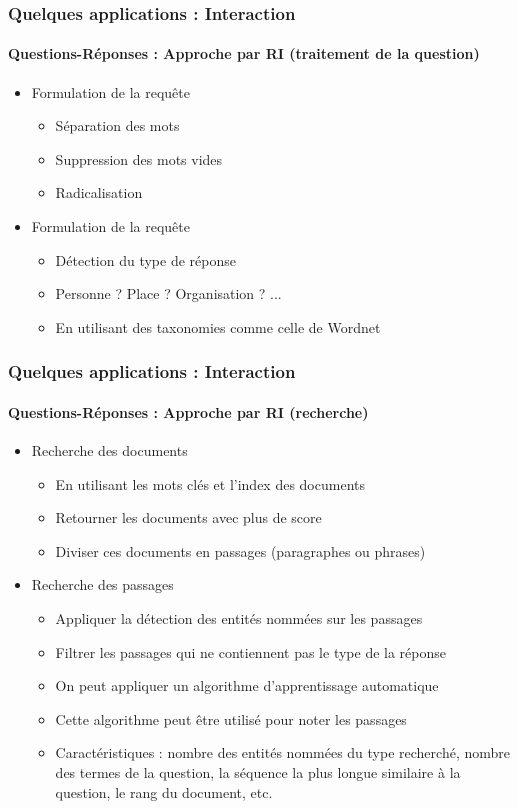 \documentclass[xcolor=table]{beamer}
\begin{document}
\begin{frame}
	\frametitle{Quelques applications : Interaction}
	\framesubtitle{Questions-Réponses : Approche par RI (traitement de la question)}
	
	\begin{itemize}
		\item Formulation de la requête
		\begin{itemize}
			\item Séparation des mots
			\item Suppression des mots vides
			\item Radicalisation  
		\end{itemize}
	    \item Formulation de la requête
	    \begin{itemize}
	    	\item Détection du type de réponse
	    	\item Personne ? Place ? Organisation ? ...
	    	\item En utilisant des taxonomies comme celle de Wordnet  
	    \end{itemize}
	\end{itemize}
	
\end{frame}

\begin{frame}
	\frametitle{Quelques applications : Interaction}
	\framesubtitle{Questions-Réponses : Approche par RI (recherche)}
	
	\begin{itemize}
		\item Recherche des documents
		\begin{itemize}
			\item En utilisant les mots clés et l'index des documents
			\item Retourner les documents avec plus de score
			\item Diviser ces documents en passages (paragraphes ou phrases)
		\end{itemize}
		\item Recherche des passages
		\begin{itemize}
			\item Appliquer la détection des entités nommées sur les passages
			\item Filtrer les passages qui ne contiennent pas le type de la réponse
			\item On peut appliquer un algorithme d'apprentissage automatique
			\item Cette algorithme peut être utilisé pour noter les passages
			\item Caractéristiques : nombre des entités nommées du type recherché, nombre des termes de la question, la séquence la plus longue similaire à la question, le rang du document, etc.
		\end{itemize}
	\end{itemize}
	
\end{frame}
\end{document}
